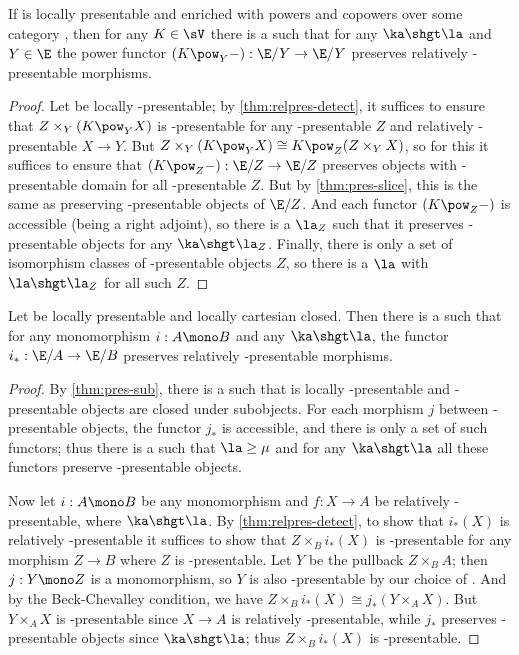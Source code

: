 \begin{lem}\label{thm:relpres-pow}
  If \E is locally presentable and enriched with powers and copowers over some category \sV, then for any $K\in \sV$ there is a \la such that for any $\ka\shgt\la$ and $Y\in \E$ the power functor $(K \pow_Y -):\E/Y \to \E/Y$ preserves relatively \ka-presentable morphisms.
\end{lem}
\begin{proof}
  Let \E be locally \mu-presentable; by \cref{thm:relpres-detect}, it suffices to ensure that $Z\times_Y (K\pow_Y X)$ is \ka-presentable for any \mu-presentable $Z$ and relatively \ka-presentable $X\to Y$.
  But $Z\times_Y (K\pow_Y X) \cong K\pow_Z (Z\times_Y X)$, so for this it suffices to ensure that $(K\pow_Z -):\E/Z\to \E/Z$ preserves objects with \ka-presentable domain for all \mu-presentable $Z$.
  But by \cref{thm:pres-slice}, this is the same as preserving \ka-presentable objects of $\E/Z$.
  And each functor $(K\pow_Z -)$ is accessible (being a right adjoint), so there is a $\la_Z$ such that it preserves \ka-presentable objects for any $\ka\shgt\la_Z$.
  Finally, there is only a set of isomorphism classes of \mu-presentable objects $Z$, so there is a $\la$ with $\la\shgt\la_Z$ for all such $Z$.
\end{proof}

\begin{lem}\label{thm:relpres-mono-dp}
  Let \E be locally presentable and locally cartesian closed.
  Then there is a \la such that for any monomorphism $i:A\mono B$ and any $\ka\shgt\la$, the functor $i_* : \E/A \to \E/B$ preserves relatively \ka-presentable morphisms.
\end{lem}
\begin{proof}
  By \cref{thm:pres-sub}, there is a \mu such that \E is locally \mu-presentable and \mu-presentable objects are closed under subobjects.
  For each morphism $j$ between \mu-presentable objects, the functor $j_*$ is accessible, and there is only a set of such functors; thus there is a \la such that $\la\ge\mu$ and for any $\ka\shgt\la$ all these functors preserve \ka-presentable objects.

  Now let $i:A\mono B$ be any monomorphism and $f:X\to A$ be relatively \ka-presentable, where $\ka\shgt\la$.
  By \cref{thm:relpres-detect}, to show that $i_*(X)$ is relatively \ka-presentable it suffices to show that $Z\times_B i_*(X)$ is \ka-presentable for any morphism $Z\to B$ where $Z$ is \mu-presentable.
  Let $Y$ be the pullback $Z\times_B A$; then $j:Y\mono Z$ is a monomorphism, so $Y$ is also \mu-presentable by our choice of \mu.
  And by the Beck-Chevalley condition, we have $Z\times_B i_*(X) \cong j_*(Y\times_A X)$.
  But $Y \times_A X$ is \ka-presentable since $X\to A$ is relatively \ka-presentable, while $j_*$ preserves \ka-presentable objects since $\ka\shgt\la$; thus $Z\times_B i_*(X)$ is \ka-presentable.
\end{proof}

